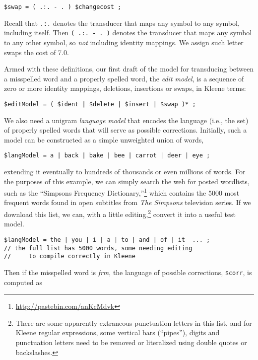 \begin{Verbatim}
$swap = ( .:. - . ) $changecost ;
\end{Verbatim}

\noindent
Recall that \texttt{.:.} denotes the transducer that maps any symbol to any
symbol, including itself.  Then \texttt{(~.:.~- .~)} denotes the transducer
that maps any symbol to any other symbol, so \emph{not} including identity mappings.  We
assign such letter swaps the cost of 7.0.

Armed with these definitions, our first draft of the model for transducing between a 
misspelled word and a properly spelled word, the \emph{edit model}, is a
sequence of zero or more identity mappings, deletions, insertions or swaps,
in Kleene terms:

\begin{Verbatim}
$editModel = ( $ident | $delete | $insert | $swap )* ;
\end{Verbatim}

We also need a unigram \emph{language model} that encodes the language (i.e., the
set) of properly spelled words that will serve as possible corrections.  
Initially, such a model can be constructed
as a simple unweighted union of words,

\begin{Verbatim}
$langModel = a | back | bake | bee | carrot | deer | eye ;
\end{Verbatim}

\noindent
extending it eventually to hundreds of thousands or even millions of words.  For the purposes
of this example, we can simply search the web for posted wordlists, such as the
``Simpsons Frequency Dictionary,''\footnote{\url{http://pastebin.com/anKcMdvk}} which contains the 5000 most frequent words
found in open subtitles from \emph{The Simpsons} television series.  If we download this list, we can, with a
little editing,\footnote{There are some apparently extraneous punctuation letters
	in this list, and for Kleene regular expressions, some vertical bars (``pipes''), digits and punctuation
letters need to be removed or literalized using double quotes or backslashes.} convert it into a useful test model.

\begin{Verbatim}
$langModel = the | you | i | a | to | and | of | it  ... ;
// the full list has 5000 words, some needing editing 
//     to compile correctly in Kleene
\end{Verbatim}

\noindent
Then if the misspelled word is \emph{frm}, the language of possible corrections,
\verb!$corr!, is computed as

